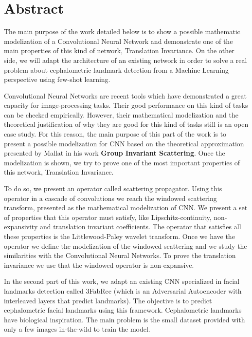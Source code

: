 %

\chapter{Abstract}

\noindent The main purpose of the work detailed below is to show a possible mathematic modelization of a Convolutional Neural Network and demonstrate one of the main properties of this kind of network, Translation Invariance.  On the other side, we will adapt the architecture of an existing network in order to solve a real problem about cephalometric landmark detection from a Machine Learning perspective using few-shot learning.

\medskip

\noindent Convolutional Neural Networks are recent tools which have demonstrated a great capacity for image-processing tasks. Their good performance on this kind of tasks can be checked empirically. However, their mathematical modelization and the theoretical justification of why they are good for this kind of tasks still is an open case study. For this reason, the main purpose of this part of the work is to present a possible modelization for CNN based on the theoretical approximation presented by Mallat in his work \textbf{Group Invariant Scattering}. Once the modelization is shown, we try to prove one of the most important properties of this network, Translation Invariance.

\medskip

\noindent To do so, we present an operator called scattering propagator. Using this operator in a cascade of convolutions we reach the windowed scattering transform, presented as the mathematical modelization of CNN. We present a set of properties that this operator must satisfy, like Lipschitz-continuity, non-expansivity and translation invariant coefficients. The operator that satisfies all these properties is the Littlewood-Paley wavelet transform. Once we have the operator we define the modelization of the windowed scattering and we study the similarities with the Convolutional Neural Networks. To prove the translation invariance we use that the windowed operator is non-expansive.

\medskip

\noindent In the second part of this work, we adapt an existing CNN specialized in facial landmarks detection called 3FabRec (which is an Adversarial Autoencoder with interleaved layers that predict landmarks). The objective is to predict cephalometric facial landmarks using this framework. Cephalometric landmarks have biological inspiration. The main problem is the small dataset provided with only a few images in-the-wild to train the model.

